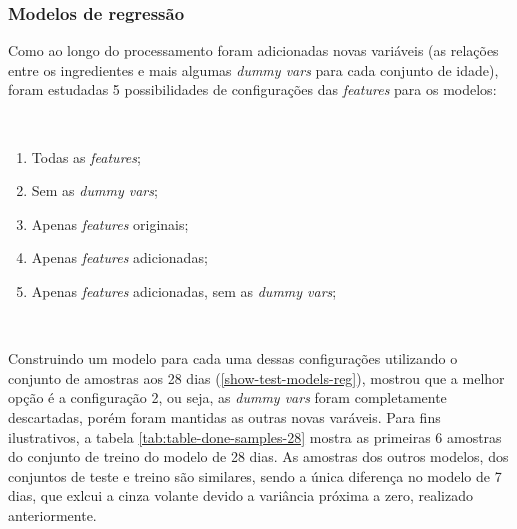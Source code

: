 \documentclass[]{article}
\providecommand{\tightlist}{%
  \setlength{\itemsep}{0pt}\setlength{\parskip}{0pt}}
\begin{document}
\hypertarget{modelos-de-regressuxe3o}{%
\subsubsection{Modelos de regressão}\label{modelos-de-regressuxe3o}}

Como ao longo do processamento foram adicionadas novas variáveis (as
relações entre os ingredientes e mais algumas \emph{dummy vars} para
cada conjunto de idade), foram estudadas 5 possibilidades de
configurações das \emph{features} para os modelos:

~

\begin{enumerate}
\def\labelenumi{\arabic{enumi}.}
\tightlist
\item
  Todas as \emph{features};
\item
  Sem as \emph{dummy vars};
\item
  Apenas \emph{features} originais;
\item
  Apenas \emph{features} adicionadas;
\item
  Apenas \emph{features} adicionadas, sem as \emph{dummy vars};
\end{enumerate}

~

Construindo um modelo para cada uma dessas configurações utilizando o
conjunto de amostras aos 28 dias (\ref{show-test-models-reg}), mostrou
que a melhor opção é a configuração 2, ou seja, as \emph{dummy vars}
foram completamente descartadas, porém foram mantidas as outras novas
varáveis. Para fins ilustrativos, a tabela
\ref{tab:table-done-samples-28} mostra as primeiras 6 amostras do
conjunto de treino do modelo de 28 dias. As amostras dos outros modelos,
dos conjuntos de teste e treino são similares, sendo a única diferença
no modelo de 7 dias, que exlcui a cinza volante devido a variância
próxima a zero, realizado anteriormente.
\end{document}
